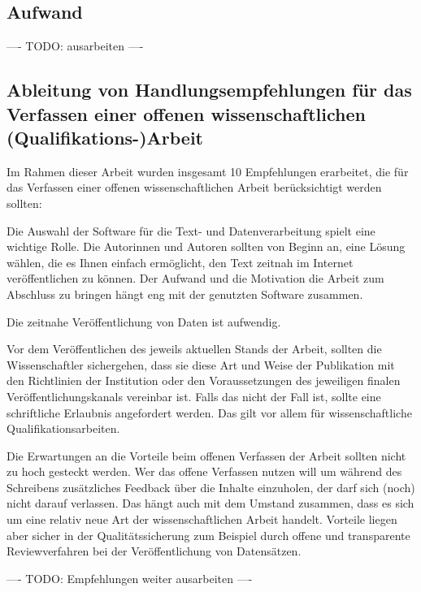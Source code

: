 \subsection{Aufwand}

---- TODO: ausarbeiten ----

\subsection{Ableitung von Handlungsempfehlungen für das Verfassen einer offenen wissenschaftlichen (Qualifikations-)Arbeit}

Im Rahmen dieser Arbeit wurden insgesamt 10 Empfehlungen erarbeitet, die für das Verfassen einer offenen wissenschaftlichen Arbeit berücksichtigt werden sollten:

Die Auswahl der Software für die Text- und Datenverarbeitung spielt eine wichtige Rolle. Die Autorinnen und Autoren sollten von Beginn an, eine Lösung wählen, die es Ihnen einfach ermöglicht, den Text zeitnah im Internet veröffentlichen zu können. Der Aufwand und die Motivation die Arbeit zum Abschluss zu bringen hängt eng mit der genutzten Software zusammen.

Die zeitnahe Veröffentlichung von Daten ist aufwendig.

Vor dem Veröffentlichen des jeweils aktuellen Stands der Arbeit, sollten die Wissenschaftler sichergehen, dass sie diese Art und Weise der Publikation mit den Richtlinien der Institution oder den Voraussetzungen des jeweiligen finalen Veröffentlichungskanals vereinbar ist. Falls das nicht der Fall ist, sollte eine schriftliche Erlaubnis angefordert werden. Das gilt vor allem für wissenschaftliche Qualifikationsarbeiten.

Die Erwartungen an die Vorteile beim offenen Verfassen der Arbeit sollten nicht zu hoch gesteckt werden. Wer das offene Verfassen nutzen will um während des Schreibens zusätzliches Feedback über die Inhalte einzuholen, der darf sich (noch) nicht darauf verlassen. Das hängt auch mit dem Umstand zusammen, dass es sich um eine relativ neue Art der wissenschaftlichen Arbeit handelt. Vorteile liegen aber sicher in der Qualitätssicherung zum Beispiel durch offene und transparente Reviewverfahren bei der Veröffentlichung von Datensätzen.

---- TODO: Empfehlungen weiter ausarbeiten ----
